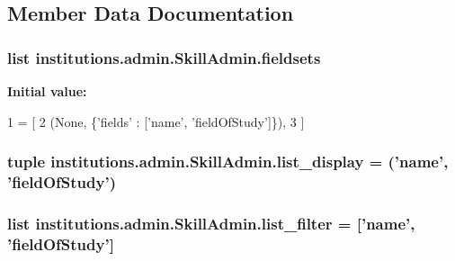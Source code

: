 \subsection{Member Data Documentation}
\hypertarget{classinstitutions_1_1admin_1_1_skill_admin_aa478f20124aeecef7eb329ed69c73ee1}{
\subsubsection[{fieldsets}]{\setlength{\rightskip}{0pt plus 5cm}list institutions.\-admin.\-Skill\-Admin.\-fieldsets\hspace{0.3cm}{\ttfamily [static]}}}\label{classinstitutions_1_1admin_1_1_skill_admin_aa478f20124aeecef7eb329ed69c73ee1}
{\bfseries Initial value\-:}
\begin{DoxyCode}
1 = [
2         (\textcolor{keywordtype}{None}, \{\textcolor{stringliteral}{'fields'} : [\textcolor{stringliteral}{'name'}, \textcolor{stringliteral}{'fieldOfStudy'}]\}),
3     ]
\end{DoxyCode}
\hypertarget{classinstitutions_1_1admin_1_1_skill_admin_adb8ac69960e1bc0ab537dc47cd5e557a}{
\subsubsection[{list\-\_\-display}]{\setlength{\rightskip}{0pt plus 5cm}tuple institutions.\-admin.\-Skill\-Admin.\-list\-\_\-display = ('name', 'field\-Of\-Study')\hspace{0.3cm}{\ttfamily [static]}}}\label{classinstitutions_1_1admin_1_1_skill_admin_adb8ac69960e1bc0ab537dc47cd5e557a}
\hypertarget{classinstitutions_1_1admin_1_1_skill_admin_a1fe2d6d3fdc0922978f12eb033fa5adb}{
\subsubsection[{list\-\_\-filter}]{\setlength{\rightskip}{0pt plus 5cm}list institutions.\-admin.\-Skill\-Admin.\-list\-\_\-filter = \mbox{[}'name', 'field\-Of\-Study'\mbox{]}\hspace{0.3cm}{\ttfamily [static]}}}\label{classinstitutions_1_1admin_1_1_skill_admin_a1fe2d6d3fdc0922978f12eb033fa5adb}
